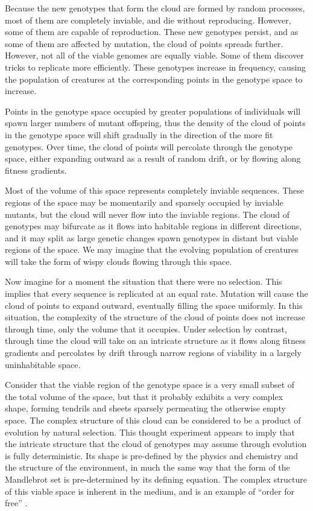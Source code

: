 Because the new genotypes that form the cloud are formed by random
processes, most of them are completely inviable, and die without
reproducing.  However, some of them are capable of reproduction.  These
new genotypes persist, and as some of them are affected by mutation, the
cloud of points spreads further.  However, not all of the viable genomes
are equally viable.  Some of them discover tricks to replicate more
efficiently.  These genotypes increase in frequency, causing the population
of creatures at the corresponding points in the genotype space to increase.

Points in the genotype space occupied by greater populations of
individuals will spawn larger numbers of mutant offspring, thus the density
of the cloud of points in the genotype space will shift gradually in the
direction of the more fit genotypes.  Over time, the cloud of points will
percolate through the genotype space, either expanding outward as a result
of random drift, or by flowing along fitness gradients.

Most of the volume of this space represents completely inviable sequences.
These regions of the space may be momentarily and sparsely occupied by
inviable mutants, but the cloud will never flow into the inviable regions.
The cloud of genotypes may bifurcate as it flows into habitable regions
in different directions, and it may split as large genetic changes spawn
genotypes in distant but viable regions of the space.  We may imagine that
the evolving population of creatures will take the form of wispy clouds
flowing through this space.

Now imagine for a moment the situation that there were no selection.
This implies that every sequence is replicated at an equal rate.  Mutation
will cause the cloud of points to expand outward, eventually filling the
space uniformly.  In this situation, the complexity of the structure of
the cloud of points does not increase through time, only the volume that
it occupies.  Under selection by contrast, through time the cloud will
take on an intricate structure as it flows along fitness gradients and
percolates by drift through narrow regions of viability in a largely
uninhabitable space.

Consider that the viable region of the genotype space is a very small
subset of the total volume of the space, but that it probably exhibits
a very complex shape, forming tendrils and sheets sparsely permeating
the otherwise empty space.  The complex structure of this cloud can be
considered to be a product of evolution by natural selection.  This
thought experiment appears to imply that the intricate structure that
the cloud of genotypes may assume through evolution is fully deterministic.
Its shape is pre-defined by the physics and chemistry and the structure of
the environment, in much the same way that the form of the Mandlebrot set
is pre-determined by its defining equation.  The complex structure of this
viable space is inherent in the medium, and is an example of ``order
for free'' \cite{Kauf}.

